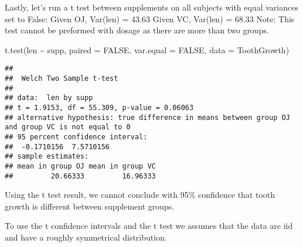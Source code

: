 \documentclass[
]{article}
\newenvironment{Shaded}{\begin{snugshade}}{\end{snugshade}}
\newcommand{\AttributeTok}[1]{\textcolor[rgb]{0.77,0.63,0.00}{#1}}
\newcommand{\ConstantTok}[1]{\textcolor[rgb]{0.00,0.00,0.00}{#1}}
\newcommand{\FunctionTok}[1]{\textcolor[rgb]{0.00,0.00,0.00}{#1}}
\newcommand{\NormalTok}[1]{#1}
\newcommand{\SpecialCharTok}[1]{\textcolor[rgb]{0.00,0.00,0.00}{#1}}
\begin{document}
Lastly, let's run a t test between supplements on all subjects with
equal variances set to False: Given OJ, Var(len) = 43.63 Given VC,
Var(len) = 68.33 Note: This test cannot be preformed with dosage as
there are more than two groups.

\begin{Shaded}
\begin{Highlighting}[]
\FunctionTok{t.test}\NormalTok{(len }\SpecialCharTok{\textasciitilde{}}\NormalTok{ supp, }\AttributeTok{paired =} \ConstantTok{FALSE}\NormalTok{, }\AttributeTok{var.equal =} \ConstantTok{FALSE}\NormalTok{, }\AttributeTok{data =}\NormalTok{ ToothGrowth)}
\end{Highlighting}
\end{Shaded}

\begin{verbatim}
## 
##  Welch Two Sample t-test
## 
## data:  len by supp
## t = 1.9153, df = 55.309, p-value = 0.06063
## alternative hypothesis: true difference in means between group OJ and group VC is not equal to 0
## 95 percent confidence interval:
##  -0.1710156  7.5710156
## sample estimates:
## mean in group OJ mean in group VC 
##         20.66333         16.96333
\end{verbatim}

Using the t test result, we cannot conclude with 95\% confidence that
tooth growth is different between supplement groups.

To use the t confidence intervals and the t test we assumes that the
data are iid and have a roughly symmetrical distribution.
\end{document}
